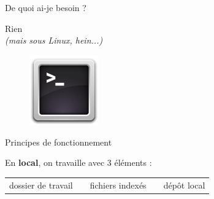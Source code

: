 \documentclass{beamer}
\begin{document}
\begin{frame}{De quoi ai-je besoin ?}
	\begin{center}
 		\Large{Rien}\\
 		{\small  \textit{(mais sous Linux, hein...)}}
	\end{center}

	\begin{figure}
		\centering
		\includegraphics[height=3cm]{img/terminal}
	\end{figure}
\end{frame}

\begin{frame}{Principes de fonctionnement}

	En \textbf{local}, on travaille avec 3 éléments :
	\begin{figure}
  		\centering
	\end{figure}
	
	\begin{center}
		\begin{tabular}{p{2cm} p{0.7cm} p{2cm} p{0.7cm} p{2cm}}
		\centering dossier de travail & & \centering fichiers indexés & & \centering dépôt local
		\end{tabular}
	\end{center}
\end{frame}
\end{document}
